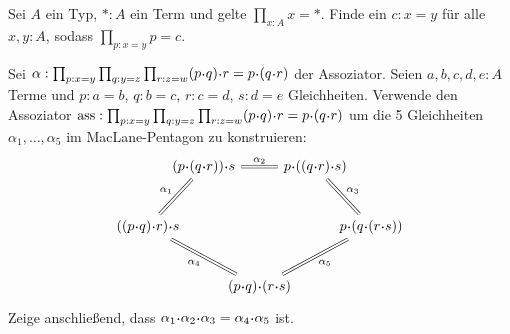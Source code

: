 \documentclass{uebung}
\begin{document}
\begin{exercise}
  Sei $A$ ein Typ, $\ast:A$ ein Term und gelte $\prod_{x:A}x=\ast$.
  Finde ein $c:x=y$ für alle $x,y:A$, sodass $\prod_{p:x=y}p=c$.
\end{exercise}

\begin{exercise}
  Sei $\alpha:\prod_{p:x=y}\prod_{q:y=z}\prod_{r:z=w} (p\kon q)\kon r = p \kon (q\kon r)$ der Assoziator.
  Seien $a,b,c,d,e:A$ Terme und $p:a=b$, $q:b=c$, $r:c=d$, $s:d=e$ Gleichheiten.
  Verwende den Assoziator $\ass:\prod_{p:x=y}\prod_{q:y=z}\prod_{r:z=w} (p\kon q)\kon r = p \kon (q\kon r)$ um die 5 Gleichheiten $\alpha_1,\dots,\alpha_5$ im MacLane-Pentagon zu konstruieren:
  \begin{equation*}
    \begin{tikzcd}[column sep={between origins,1.4cm},row sep={between origins,1.5cm}]
      & (p \kon (q \kon r)) \kon s
      \arrow[rr,equal,"\alpha_2"]
      && p \kon ((q \kon r) \kon s)
      \arrow[dr,equal,"\alpha_3"]
      &
      \\
      ((p \kon q) \kon r) \kon s
      \arrow[ur,equal,"\alpha_1"]
      \arrow[drr,equal,"\alpha_4"']
      &&&& p \kon (q \kon (r \kon s))
      \\
      && (p \kon q) \kon (r \kon s)
      \arrow[urr,equal,"\alpha_5"']
      &&
    \end{tikzcd}
  \end{equation*}
  Zeige anschließend, dass $\alpha_1\kon\alpha_2\kon\alpha_3 = \alpha_4\kon\alpha_5$ ist.
\end{exercise}
\end{document}
